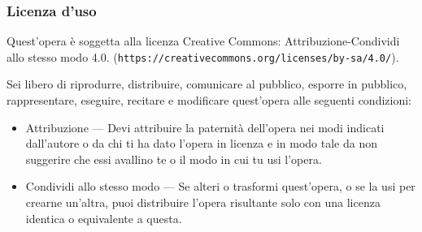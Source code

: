\begin{frame}[containsverbatim]\frametitle{Licenza d'uso}
  \small

  Quest'opera {\`e} soggetta alla licenza Creative Commons:
Attribuzione-Condividi allo stesso modo 4.0.
  (\verb+https://creativecommons.org/licenses/by-sa/4.0/+).

Sei libero di riprodurre, distribuire, comunicare al pubblico, esporre
in pubblico, rappresentare, eseguire, recitare e modificare quest'opera
alle seguenti condizioni:
\begin{itemize}
\item
Attribuzione — Devi attribuire la paternit{\`a} dell'opera nei modi
indicati dall'autore o da chi ti ha dato l'opera in licenza e in modo tale da
non suggerire che essi avallino te o il modo in cui tu usi l'opera.
\item
Condividi allo stesso modo — Se alteri o trasformi quest'opera, o se
la usi per crearne un'altra, puoi distribuire l'opera risultante solo con
una licenza identica o equivalente a  questa.
\end{itemize}
\end{frame}


